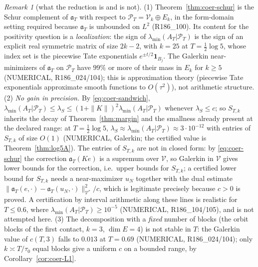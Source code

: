 \documentclass[11pt]{amsart}
\theoremstyle{definition}
\theoremstyle{remark}
\newtheorem{remark}[theorem]{Remark}
\newcommand{\PT}{\mathcal P_T}
\newcommand{\lamA}{\lambda_{\min}(A_T|\PT)}
\begin{document}
\begin{remark}[what the reduction is and is not]\label{rem:coer-honest}
(1) Theorem~\ref{thm:coer-schur} is the Schur complement of $\mathfrak a_T$ with respect to $\PT=\mathcal V_k\oplus E_k$,
in the form-domain setting required because $\mathfrak a_T$ is unbounded on $L^2$ (R186\_100). Its content for the
positivity question is a \emph{localization}: the sign of $\lamA$ is the sign of an explicit real symmetric matrix of
size $2k-2$, with $k=25$ at $T=\frac12\log5$, whose index set is the piecewise Tate exponentials
$e^{\pm t/2}\mathbf 1_{B_j}$. The Galerkin near-minimizers of $\mathfrak a_T$ on $\PT$ have $99\%$ or more of their mass in
$E_k$ for $k\ge5$ (NUMERICAL, R186\_024/104); this is approximation theory (piecewise Tate exponentials approximate
smooth functions to $O(\tau^2)$), not arithmetic structure.
(2) \emph{No gain in precision.} By \eqref{eq:coer-sandwich}, $\lamA\le\lambda_S\le(1+\|K\|)^2\lamA$ whenever
$\lambda_S\le c$; so $S_{T,k}$ inherits the decay of Theorem~\ref{thm:margin} and the smallness already present at
the declared range: at $T=\frac12\log5$, $\lambda_S\approx\lamA\approx3\cdot10^{-12}$ with entries of $S_{T,k}$ of size
$O(1)$ (NUMERICAL, Galerkin; the certified value is Theorem~\ref{thm:log5A}). The entries of $S_{T,k}$ are not in
closed form: by \eqref{eq:coer-schur} the correction $\mathfrak a_T(Ke)$ is a supremum over $\mathcal V$, so Galerkin in
$\mathcal V$ gives lower bounds for the correction, i.e.\ upper bounds for $S_{T,k}$; a certified lower bound for $S_{T,k}$
needs a near-maximizer $u_N$ together with the dual estimate $\|\mathfrak a_T(e,\cdot)-\mathfrak a_T(u_N,\cdot)\|^2_{\mathcal V^*}/c$,
which is legitimate precisely because $c>0$ is proved. A certification by interval arithmetic along these lines is
realistic for $T\le0.6$, where $\lamA\ge10^{-5}$ (NUMERICAL, R186\_104/105), and is not attempted here.
(3) The decomposition with a \emph{fixed} number of blocks (the orbit blocks of the first contact, $k=3$, $\dim E=4$)
is not stable in $T$: the Galerkin value of $c(T,3)$ falls to $0.013$ at $T=0.69$ (NUMERICAL, R186\_024/104); only
$k\asymp T/\tau_0$ equal blocks give a uniform $c$ on a bounded range, by Corollary~\ref{cor:coer-L1}.
\end{remark}
\end{document}
